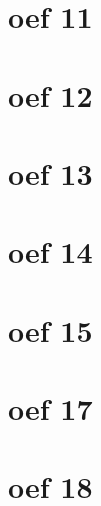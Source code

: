 \documentclass[lineaire_algebra_oplossingen.tex]{subfiles}
\begin{document}
\section{oef 11}
\section{oef 12}
\section{oef 13}
\section{oef 14}
\section{oef 15}
\section{oef 17}
\section{oef 18}
\end{document}
